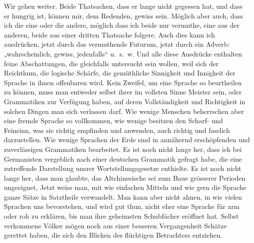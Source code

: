 Wir gehen weiter. Beide Thatsachen, dass er lange nicht gegessen hat, und dass er hungrig ist, können mir, dem Redenden, gewiss sein. Möglich aber auch, dass ich die eine oder die andere, möglich dass ich beide nur vermuthe, eine aus der anderen, beide aus einer dritten Thatsache folgere. Auch dies kann ich ausdrücken, jetzt durch das vermuthende Futurum, jetzt durch ein Adverb: „wahrscheinlich, gewiss, jedenfalls“ u.~s.~w. Und alle diese Ausdrücke enthalten feine Abschattungen, die gleichfalls untersucht sein wollen, weil sich der Reichthum, die logische Schärfe, die gemüthliche Sinnigkeit und Innigkeit der Sprache in ihnen offenbaren wird. Kein Zweifel, um eine Sprache so beurtheilen zu \label{sp.450} können, muss man entweder selbst ihrer im vollsten Sinne Meister sein, oder Grammatiken zur Verfügung haben, auf deren Vollständigkeit und Richtigkeit in solchen Dingen man sich verlassen darf. Wie wenige Menschen beherrschen aber eine fremde Sprache so vollkommen, wie wenige besitzen den Scharf- und Feinsinn,  was sie richtig empfinden und anwenden, auch richtig und fasslich darzustellen. Wie wenige Sprachen der Erde sind in annähernd erschöpfenden und zuverlässigen Grammatiken bearbeitet. Es ist noch nicht lange her, dass ich bei Germanisten vergeblich nach einer deutschen Grammatik gefragt habe, die eine zutreffende Darstellung unsrer Wortstellungsgesetze enthielte. Es ist noch nicht lange her, dass man glaubte, das Altchinesische sei zum Baue grösserer Perioden ungeeignet, Jetzt weiss man, mit wie einfachen Mitteln und wie gern die Sprache ganze Sätze in Satztheile verwandelt. Man kann aber nicht ahnen, in wie vielen Sprachen uns  bevorstehen, und wird gut thun, nicht eher eine Sprache für arm oder roh zu erklären, bis man ihre geheimsten Schubfächer er\label{fp.430}öffnet hat. Selbst verkommene Völker mögen noch aus einer besseren Vergangenheit Schätze gerettet haben, die sich den Blicken des flüchtigen Betrachters entziehen.

